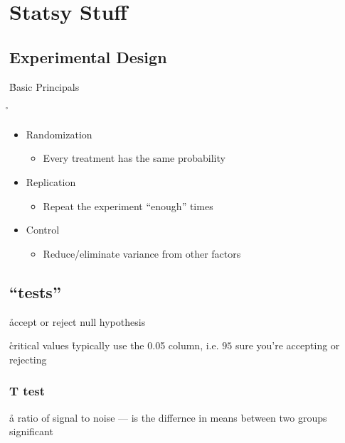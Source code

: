 \chapter{Statsy Stuff}


\section{Experimental Design}

\r{Basic Principals}

\r{
	\begin{itemize}[noitemsep,topsep=0pt]
		\item Randomization
		\begin{itemize}[noitemsep,topsep=0pt]
			\item Every treatment has the same probability
		\end{itemize}
		\item Replication
		\begin{itemize}[noitemsep,topsep=0pt]
			\item Repeat the experiment ``enough'' times
		\end{itemize}
		\item Control
		\begin{itemize}[noitemsep,topsep=0pt]
			\item Reduce/eliminate variance from other factors
		\end{itemize}
	\end{itemize}
}

\section{``tests''}

\r{accept or reject null hypothesis}


\r{critical values \r{typically use the 0.05 column, i.e. $95$ sure you're accepting or rejecting}}

\subsection{T test}


\r{a ratio of signal to noise --- is the differnce in means between two groups significant }

